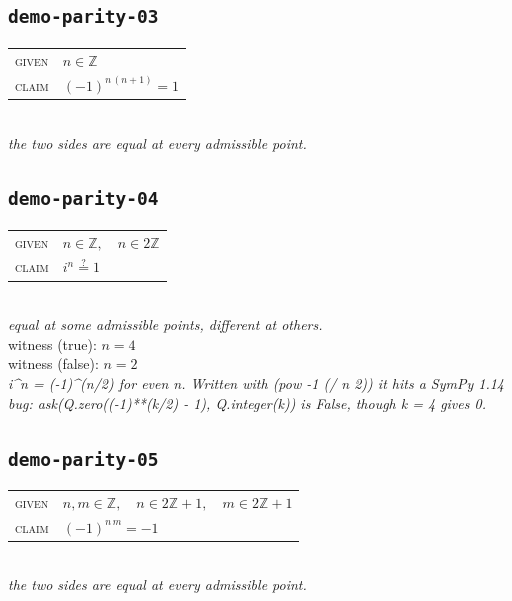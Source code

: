 \documentclass[11pt]{article}
\begin{document}
\subsection*{\texttt{demo-parity-03}}
\begin{tabular}{@{}l@{\quad}l@{}}
\textsc{given} & $n \in \mathbb{Z}$ \\[4pt]
\textsc{claim} & $\displaystyle \left(-1\right)^{n \, \left(n + 1\right)} = 1$ \\
\end{tabular}\\[2pt]
{\small\emph{the two sides are equal at every admissible point.}}\\

\subsection*{\texttt{demo-parity-04}}
\begin{tabular}{@{}l@{\quad}l@{}}
\textsc{given} & $n \in \mathbb{Z},\quad n \in 2\mathbb{Z}$ \\[4pt]
\textsc{claim} & $\displaystyle i^{n} \overset{?}{=} 1$ \\
\end{tabular}\\[2pt]
{\small\emph{equal at some admissible points, different at others.}}\\
{\footnotesize\color{gray}witness (true): $n = 4$}\\
{\footnotesize\color{gray}witness (false): $n = 2$}\\
\emph{i\textasciicircum{}n = (-1)\textasciicircum{}(n/2) for even n.  Written with (pow -1 (/ n 2)) it hits a SymPy 1.14 bug: ask(Q.zero((-1)**(k/2) - 1), Q.integer(k)) is False, though k = 4 gives 0.}\\

\subsection*{\texttt{demo-parity-05}}
\begin{tabular}{@{}l@{\quad}l@{}}
\textsc{given} & $n, m \in \mathbb{Z},\quad n \in 2\mathbb{Z} + 1,\quad m \in 2\mathbb{Z} + 1$ \\[4pt]
\textsc{claim} & $\displaystyle \left(-1\right)^{n \, m} = -1$ \\
\end{tabular}\\[2pt]
{\small\emph{the two sides are equal at every admissible point.}}\\
\end{document}
